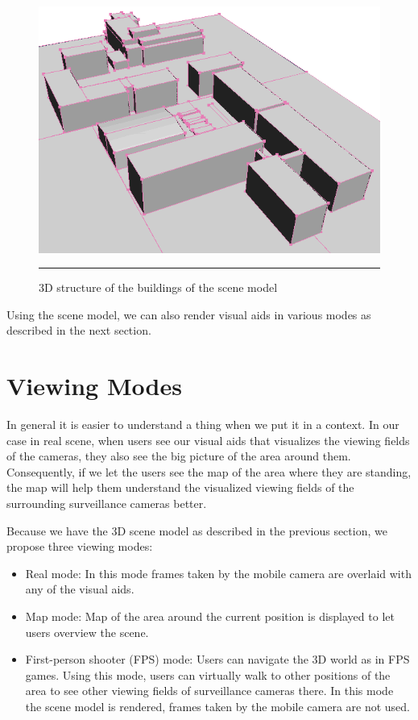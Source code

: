 \begin{figure}[htbp]
	\centering
	\includegraphics[width=14cm]{./Primitives/scene_model.png}
	\rule{35em}{0.5pt}
	\caption[Scene model]{3D structure of the buildings of the scene model}
	\label{fig:SceneModel}
\end{figure}

Using the scene model, we can also render visual aids in various modes as described in the next section.


\section{Viewing Modes}
\label{ViewingModes}

In general it is easier to understand a thing when we put it in a context. In our case in real scene, when users see our visual aids that visualizes the viewing fields of the cameras, they also see the big picture of the area around them. Consequently, if we let the users see the map of the area where they are standing, the map will help them understand the visualized viewing fields of the surrounding surveillance cameras better.

Because we have the 3D scene model as described in the previous section, we propose three viewing modes:

\begin{itemize}
	\item Real mode: In this mode frames taken by the mobile camera are overlaid with any of the visual aids.
	\item Map mode: Map of the area around the current position is displayed to let users overview the scene.
	\item First-person shooter (FPS) mode: Users can navigate the 3D world as in FPS games. Using this mode, users can virtually walk to other positions of the area to see other viewing fields of surveillance cameras there. In this mode the scene model is rendered, frames taken by the mobile camera are not used.
\end{itemize}

